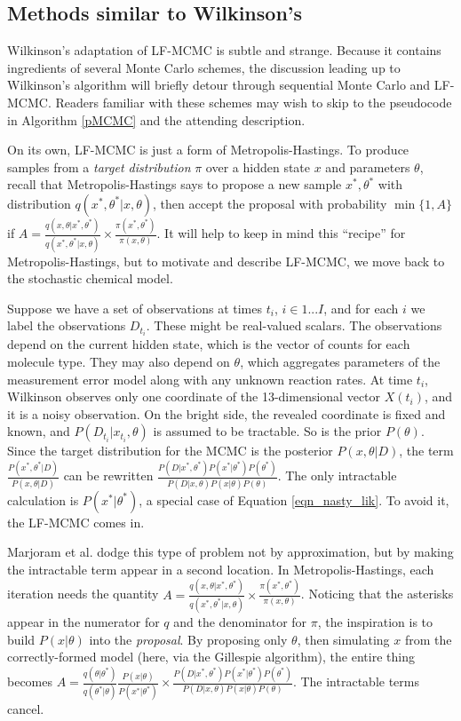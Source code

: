 \documentclass{article}
\begin{document}
\subsection{Methods similar to Wilkinson's}
\label{MC_backgr}
Wilkinson's adaptation of LF-MCMC is subtle and strange. Because it contains ingredients of several Monte Carlo schemes, the discussion leading up to Wilkinson's algorithm will briefly detour through sequential Monte Carlo and LF-MCMC. Readers familiar with these schemes may wish to skip to the pseudocode in Algorithm \ref{pMCMC} and the attending description. 

On its own, LF-MCMC is just a form of Metropolis-Hastings. To produce samples from a {\it target distribution} $\pi$ over a hidden state $x$ and parameters $\theta$, recall that Metropolis-Hastings says to propose a new sample $x^*, \theta^*$ with distribution $q(x^*, \theta^*|x, \theta)$, then accept the proposal with probability $\min \{1, A\}$ if $A=\frac{q(x, \theta|x^*, \theta^*)}{q(x^*, \theta^*|x, \theta)} \times \frac{\pi(x^*, \theta^*)}{\pi(x, \theta)}$. It will help to keep in mind this ``recipe'' for Metropolis-Hastings, but to motivate and describe LF-MCMC, we move back to the stochastic chemical model.

Suppose we have a set of observations at times $t_i$, $i \in 1...I$, and for each $i$ we label the observations $D_{t_i}$. These might be real-valued scalars. The observations depend on the current hidden state, which is the vector of counts for each molecule type. They may also depend on $\theta$, which aggregates parameters of the measurement error model along with any unknown reaction rates. At time $t_i$, Wilkinson observes only one coordinate of the 13-dimensional vector $X(t_i)$, and it is a noisy observation. On the bright side, the revealed coordinate is fixed and known, and $P(D_{t_{i}}|x_{t_i}, \theta)$ is assumed to be tractable. So is the prior $P(\theta)$. Since the target distribution for the MCMC is the posterior $P(x, \theta|D)$, the term $\frac{P(x^*, \theta^*|D)}{P(x, \theta|D)}$ can be rewritten $\frac{P(D|x^*, \theta^*)P(x^*|\theta^*)P(\theta^*)}{P(D|x, \theta)P(x| \theta)P(\theta)}$. The only intractable calculation is $P(x^*|\theta^*)$, a special case of Equation \ref{eqn_nasty_lik}. To avoid it, the LF-MCMC comes in.

Marjoram et al. dodge this type of problem not by approximation, but by making the intractable term appear in a second location. In Metropolis-Hastings, each iteration needs the quantity $A=\frac{q(x, \theta|x^*, \theta^*)}{q(x^*, \theta^*|x, \theta)} \times \frac{\pi(x^*, \theta^*)}{\pi(x, \theta)}$. Noticing that the asterisks appear in the numerator for $q$ and the denominator for $\pi$, the inspiration is to build $P(x| \theta)$ into the {\it proposal}. By proposing only $\theta$, then simulating $x$ from the correctly-formed model (here, via the Gillespie algorithm), the entire thing becomes $A=\frac{q(\theta|\theta^*)}{q(\theta^*|\theta)} \frac{P(x|\theta)}{P(x^*|\theta^*)} \times \frac{P(D|x^*, \theta^*)P(x^*|\theta^*)P(\theta^*)}{P(D|x, \theta)P(x| \theta)P(\theta)}$. The intractable terms cancel.
\end{document}
